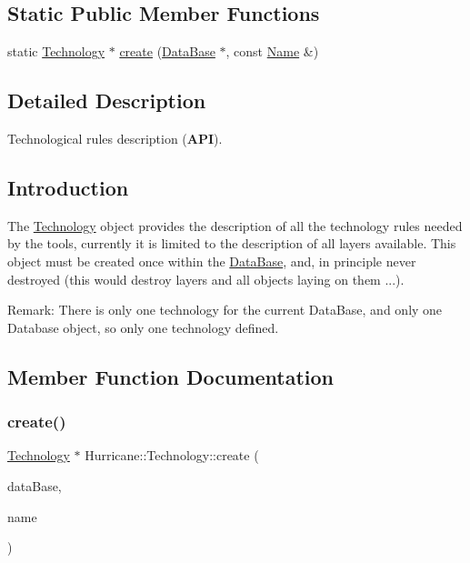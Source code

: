 \subsection*{Static Public Member Functions}
\begin{DoxyCompactItemize}
\item 
static \mbox{\hyperlink{classHurricane_1_1Technology}{Technology}} $\ast$ \mbox{\hyperlink{classHurricane_1_1Technology_a8fd65387c7fd6ba1396f905fadf20087}{create}} (\mbox{\hyperlink{classHurricane_1_1DataBase}{Data\+Base}} $\ast$, const \mbox{\hyperlink{classHurricane_1_1Name}{Name}} \&)
\end{DoxyCompactItemize}


\subsection{Detailed Description}
Technological rules description ({\bfseries A\+PI}). 

\hypertarget{classHurricane_1_1Technology_sTechnologyIntro}{}\subsection{Introduction}\label{classHurricane_1_1Technology_sTechnologyIntro}
The \mbox{\hyperlink{classHurricane_1_1Technology}{Technology}} object provides the description of all the technology rules needed by the tools, currently it is limited to the description of all layers available. This object must be created once within the \mbox{\hyperlink{classHurricane_1_1DataBase}{Data\+Base}}, and, in principle never destroyed (this would destroy layers and all objects laying on them ...).

\begin{DoxyParagraph}{Remark\+: There is only one technology for the current Data\+Base, and only one}
Database object, so only one technology defined. 
\end{DoxyParagraph}


\subsection{Member Function Documentation}
\mbox{\label{classHurricane_1_1Technology_a8fd65387c7fd6ba1396f905fadf20087}} 
\subsubsection{\texorpdfstring{create()}{create()}}
{\footnotesize\ttfamily \mbox{\hyperlink{classHurricane_1_1Technology}{Technology}} $\ast$ Hurricane\+::\+Technology\+::create (\begin{DoxyParamCaption}\item[{\mbox{\hyperlink{classHurricane_1_1DataBase}{Data\+Base}} $\ast$}]{data\+Base,  }\item[{const \mbox{\hyperlink{classHurricane_1_1Name}{Name}} \&}]{name }\end{DoxyParamCaption})\hspace{0.3cm}{\ttfamily [static]}}

